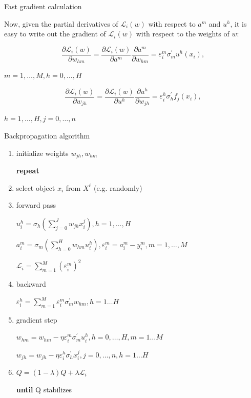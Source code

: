 \documentclass[fullscreen=true, bookmarks=true, hyperref={pdfencoding=unicode}]{beamer}
\begin{document}
\begin{frame}{Fast gradient calculation}

Now, given the partial derivatives of $\mathcal{L}_i(w)$ with respect to $a^m$ and $u^h$, it is easy to write out the gradient of $\mathcal{L}_i(w)$ with respect to the weights of $w$:

$$\frac{\partial \mathcal{L}_i(w)}{\partial w_{hm}} = \frac{\partial \mathcal{L}_i(w)}{\partial a^m} \frac{ \partial a^m}{\partial w_{hm}} = \varepsilon_i^m \sigma^\prime_m u^h(x_i),$$

$m = 1, \dots, M, h = 0, \dots, H$

$$\frac{\partial \mathcal{L}_i(w)}{\partial w_{jh}} = \frac{\partial \mathcal{L}_i(w)}{\partial u^h} \frac{ \partial u^h}{\partial w_{jh}} = \varepsilon_i^h \sigma^\prime_h f_j(x_i),$$ 

$h = 1, \dots, H, j = 0, \dots, n$
\end{frame}


\begin{frame}{Backpropagation algorithm}

\begin{enumerate}
    \item initialize weights $w_{jh}, w_{hm}$
    
    {\bf repeat}
    \item select object $x_i$ from $X^\ell$ (e.g. randomly)
    \item forward pass
    
      $u_i^h = \sigma_h \left(\sum_{j=0}^J w_{jh}x_i^j \right), h = 1, \dots, H$
    
      $a_i^m = \sigma_m \left(\sum_{h=0}^H w_{hm}u_i^h \right), \varepsilon_i^m = a_i^m - y_i^m, m = 1, \dots, M$
    
      $\mathcal{L}_i = \sum_{m=1}^M (\varepsilon_i^m)^2$

    \item backward
    
      $\varepsilon_i^h =\sum\limits_{m=1}^M \varepsilon_i^m \sigma_m^\prime w_{hm}, h = 1\dots H$

    \item gradient step
    
      $w_{hm} = w_{hm} - \eta \varepsilon_i^m\sigma_m^\prime u_i^h, h = 0, \dots, H, m = 1\dots M$

      $w_{jh} = w_{jh} - \eta \varepsilon_i^h\sigma_h^\prime x_i^j, j = 0, \dots, n, h = 1\dots H$

    \item $Q = (1 - \lambda)Q + \lambda \mathcal{L}_i$

    {\bf until} Q stabilizes    
\end{enumerate}
\end{frame}
\end{document}
